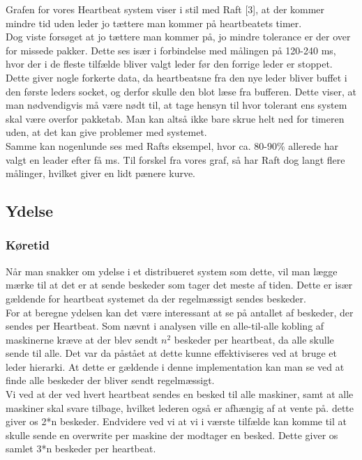\documentclass[a4paper,12pt]{article}
\begin{document}
Grafen for vores Heartbeat system viser i stil med Raft [3], at der kommer mindre tid uden leder jo tættere man kommer på heartbeatets timer.
\\
Dog viste forsøget at jo tættere man kommer på, jo mindre tolerance er der over for missede pakker. Dette ses især i forbindelse med målingen på 120-240 ms, hvor der i de fleste tilfælde bliver valgt leder før den forrige leder er stoppet. Dette giver nogle forkerte data, da heartbeatsne fra den nye leder bliver buffet i den første leders socket, og derfor skulle den blot læse fra bufferen. Dette viser, at man nødvendigvis må være nødt til, at tage hensyn til hvor tolerant ens system skal være overfor pakketab. Man kan altså ikke bare skrue helt ned for timeren uden, at det kan give problemer med systemet. 
\\
Samme kan nogenlunde ses med Rafts eksempel, hvor ca. 80-90\% allerede har valgt en leader efter få ms. Til forskel fra vores graf, så har Raft dog langt flere målinger, hvilket giver en lidt pænere kurve.

\subsection{Ydelse}
\subsubsection{Køretid}
Når man snakker om ydelse i et distribueret system som dette, vil man lægge mærke til at det er at sende beskeder som tager det meste af tiden. Dette er især gældende for heartbeat systemet da der regelmæssigt sendes beskeder.
\\
For at beregne ydelsen kan det være interessant at se på antallet af beskeder, der sendes per Heartbeat.
Som nævnt i analysen ville en alle-til-alle kobling af maskinerne kræve at der blev sendt $n^2$ beskeder per heartbeat, da alle skulle sende til alle. 
Det var da påstået at dette kunne effektiviseres ved at bruge et leder hierarki.
At dette er gældende i denne implementation kan man se ved at finde alle beskeder der bliver sendt regelmæssigt.
\\
Vi ved at der ved hvert heartbeat sendes en besked til alle maskiner, samt at alle maskiner skal svare tilbage, hvilket lederen også er afhængig af at vente på. dette giver os 2*n beskeder. Endvidere ved vi at vi i værste tilfælde kan komme til at skulle sende en overwrite per maskine der modtager en besked. Dette giver os samlet 3*n beskeder per heartbeat.
\newpage
\end{document}
